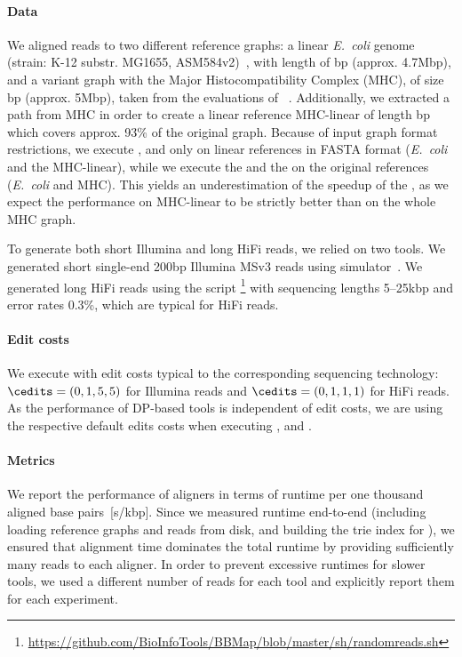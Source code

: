 \paragraph{Data}
%
We aligned reads to two different reference graphs: a linear \textit{E.~coli}
genome (strain: K-12 substr. MG1655, ASM584v2)~\citep{howe2019ensembl}, with
length of bp (approx. 4.7Mbp), and a variant graph with the
Major Histocompatibility Complex (MHC), of size bp (approx.
5Mbp), taken from the evaluations of \pasgal~\citep{jain_accelerating_2019}.
%
Additionally, we extracted a path from MHC in order to create a linear reference
MHC-linear of length bp which covers approx. 93\% of the
original graph. Because of input graph format restrictions, we execute
\graphaligner, \vargas and \pasgal only on linear references in FASTA format
(\textit{E.~coli} and the MHC-linear), while we execute the \seedh and the
\prefixh on the original references (\textit{E.~coli} and MHC). This yields an
underestimation of the speedup of the \seedh, as we expect the performance on
MHC-linear to be strictly better than on the whole MHC graph.

To generate both short Illumina and long HiFi reads, we relied on two tools. We
generated short single-end 200bp Illumina MSv3 reads using \art
simulator~\citep{huang2011art}. We generated long HiFi reads using the script
\randomreads\footnote{\url{https://github.com/BioInfoTools/BBMap/blob/master/sh/randomreads.sh}}
with sequencing lengths \mbox{5--25kbp} and error rates 0.3\%, which are typical
for HiFi reads.

\paragraph{Edit costs}
We execute \astarix with edit costs typical to the corresponding sequencing
technology: $\cedits=(0,1,5,5)$ for Illumina reads and $\cedits=(0,1,1,1)$ for
HiFi reads. As the performance of DP-based tools is independent of edit costs,
we are using the respective default edits costs when executing \graphaligner,
\pasgal and \vargas.


\paragraph{Metrics}
%
We report the performance of aligners in terms of runtime per one thousand
aligned base pairs~[s/kbp]. Since we measured runtime end-to-end (including
loading reference graphs and reads from disk, and building the trie index for
\astarix), we ensured that alignment time dominates the total runtime by
providing sufficiently many reads to each aligner. In order to prevent excessive
runtimes for slower tools, we used a different number of reads for each tool
and explicitly report them for each experiment.

